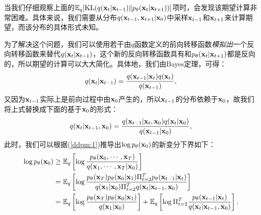 \documentclass[11pt,a4paper,UTF8]{ctexart}
\begin{document}
当我们仔细观察上面的$\mathbb{E}_q[\text{KL}(q(\mathbf{x}_t|\mathbf{x}_{t-1}) \| p_{\theta}(\mathbf{x}_{t}|\mathbf{x}_{t+1}))]$项时，会发现该期望计算非常困难。具体来说，我们需要从分布$q(\mathbf{x}_{t-1},\mathbf{x}_{t+1}|\mathbf{x}_0)$中采样$\mathbf{x}_{t-1}$和$\mathbf{x}_{t+1}$来计算期望，而该分布的具体形式未知。

为了解决这个问题，我们可以使用若干由$q$函数定义的前向转移函数\emph{模拟出}一个反向转移函数来替代$q(\mathbf{x}_t|\mathbf{x}_{t-1})$，这个新的反向转移函数具有和$p_{\theta}(\mathbf{x}_t|\mathbf{x}_{t+1})$都是反向的，所以期望的计算可以大大简化。具体地，我们由Bayes定理，可得：
\begin{equation*}
    q(\mathbf{x}_t|\mathbf{x}_{t-1})=\frac{q(\mathbf{x}_{t-1}|\mathbf{x}_t)q(\mathbf{x}_t)}{q(\mathbf{x}_{t-1})},
\end{equation*}
又因为$\mathbf{x}_{t-1}$实际上是前向过程中由$\mathbf{x}_0$产生的，所以$\mathbf{x}_{t-1}$的分布依赖于$\mathbf{x}_0$，故我们将上式替换成下面的基于$\mathbf{x}_0$的形式：
\begin{equation}
    q(\mathbf{x}_t|\mathbf{x}_{t-1},\mathbf{x}_0)=\frac{q(\mathbf{x}_{t-1}|\mathbf{x}_t,\mathbf{x}_0)q(\mathbf{x}_t|\mathbf{x}_0)}{q(\mathbf{x}_{t-1}|\mathbf{x}_0)},
\label{ddpm:bayes}
\end{equation}
此时，我们可以根据(\ref{ddpm:1})推导出$\log p_{\theta}(\mathbf{x}_0)$的新变分下界如下：
\begin{align}
\begin{split}
    \log p_{\theta}(\mathbf{x}_0) & \geq \mathbb{E}_q \left[\log \frac{p_{\theta}(\mathbf{x}_0,\cdots,\mathbf{x}_T)}{q(\mathbf{x}_1,\cdots,\mathbf{x}_T|\mathbf{x}_0)}\right] \\
    &= \mathbb{E}_q \left[\log\frac{p_{\theta}(\mathbf{x}_T)p_{\theta}(\mathbf{x}_0|\mathbf{x}_1)\Pi_{t=2}^T p_{\theta}(\mathbf{x}_{t-1}|\mathbf{x}_t)}{q(\mathbf{x}_1|\mathbf{x}_0)\Pi_{t=2}^T q(\mathbf{x}_t|\mathbf{x}_{t-1},\mathbf{x}_0)} \right] \\
    &= \mathbb{E}_q \left[\log\frac{p_{\theta}(\mathbf{x}_T)p_{\theta}(\mathbf{x}_0|\mathbf{x}_1)}{q(\mathbf{x}_1|\mathbf{x}_0)} \right] + \mathbb{E}_q \left[\log \Pi_{t=2}^T \frac{p_{\theta}(\mathbf{x}_{t-1}|\mathbf{x}_t)}{q(\mathbf{x}_t|\mathbf{x}_{t-1},\mathbf{x}_0)} \right].
\end{split}
\label{ddpm:3}
\end{align}
\end{document}
